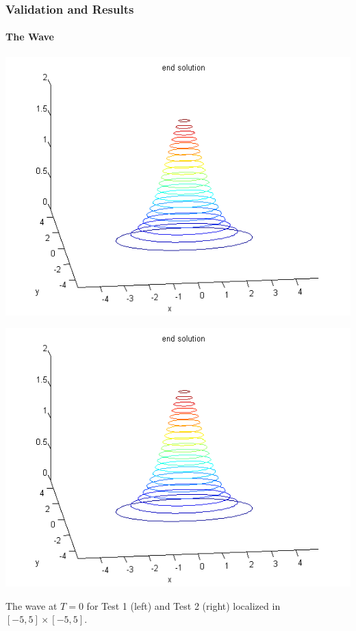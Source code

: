 \documentclass{beamer}
\begin{document}
\begin{frame}
\frametitle{Validation and Results}
\framesubtitle{The Wave}

\begin{center}\vspace{0.4cm}
	\begin{minipage}[b]{0.45\linewidth}
		 \includegraphics[width=\linewidth]{figures/nivoLines_bt3.png}
	\end{minipage}	
	\begin{minipage}[b]{0.45\linewidth}
		\includegraphics[width=\linewidth]{figures/nivoLines_bt3.png}
		
	\end{minipage}

\end{center}
The wave at $T=0$ for Test 1 (left) and Test 2 (right) localized in $[-5,5]\times[-5,5]$.

\end{frame}
\end{document}
